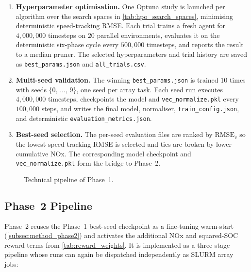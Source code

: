 \begin{enumerate}
  \item \textbf{Hyperparameter optimisation.} One Optuna study is launched per algorithm over the search spaces in \autoref{tab:hpo_search_spaces}, minimising deterministic speed-tracking \ac{RMSE}. Each trial trains a fresh agent for $4{,}000{,}000$ timesteps on $20$ parallel environments, evaluates it on the deterministic six-phase cycle every $500{,}000$ timesteps, and reports the result to a median pruner. The selected hyperparameters and trial history are saved as \texttt{best\_params.json} and \texttt{all\_trials.csv}.
  \item \textbf{Multi-seed validation.} The winning \texttt{best\_params.json} is trained $10$ times with seeds $\{0,\,\dots,\,9\}$, one seed per array task. Each seed run executes $4{,}000{,}000$ timesteps, checkpoints the model and \texttt{vec\_normalize.pkl} every $100{,}000$ steps, and writes the final model, normaliser, \linebreak\texttt{train\_config.json}, and deterministic \texttt{evaluation\_metrics.json}.
  \item \textbf{Best-seed selection.} The per-seed evaluation files are ranked by $\mathrm{RMSE}_v$ so the lowest speed-tracking \ac{RMSE} is selected and ties are broken by lower cumulative \ac{NOx}. The corresponding model checkpoint and \texttt{vec\_normalize.pkl} form the bridge to Phase~2.
\end{enumerate}

\begin{figure}[htbp]
  \centering
  
  \caption[Technical pipeline of Phase~1]{Technical pipeline of Phase~1.}
  \label{fig:phase1}
\end{figure}

\subsection{Phase~2 Pipeline}
\label{subsec:impl_phase2_pipeline}
Phase~2 reuses the Phase~1 best-seed checkpoint as a fine-tuning warm-start (\autoref{subsec:method_phase2}) and activates the additional \ac{NOx} and squared-\ac{SOC} reward terms from \autoref{tab:reward_weights}. It is implemented as a three-stage pipeline whose runs can again be dispatched independently as SLURM array jobs:

